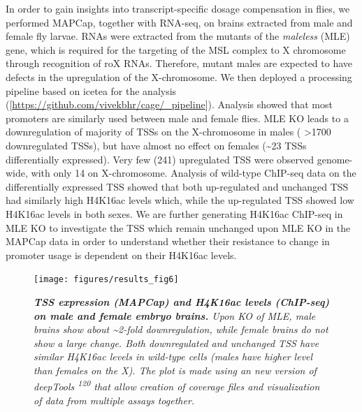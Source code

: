 \documentclass[11pt,twoside]{MPIthesis}
\theoremstyle{definition}
\theoremstyle{definition}
\theoremstyle{definition}
\theoremstyle{remark}
\begin{document}
In order to gain insights into transcript-specific dosage compensation
in flies, we performed MAPCap, together with RNA-seq, on brains
extracted from male and female fly larvae. RNAs were extracted from the
mutants of the \emph{maleless} (MLE) gene, which is required for the
targeting of the MSL complex to X chromosome through recognition of roX
RNAs. Therefore, mutant males are expected to have defects in the
upregulation of the X-chromosome. We then deployed a processing pipeline
based on icetea for the analysis
({[}{\url{https://github.com/vivekbhr/cage/_pipeline}}{]}). Analysis
showed that most promoters are similarly used between male and female
flies. MLE KO leads to a downregulation of majority of TSSs on the
X-chromosome in males ( \textgreater{}1700 downregulated TSSs), but have
almost no effect on females (\textasciitilde{}23 TSSs differentially
expressed). Very few (241) upregulated TSS were observed genome-wide,
with only 14 on X-chromosome. Analysis of wild-type ChIP-seq data on the
differentially expressed TSS showed that both up-regulated and unchanged
TSS had similarly high H4K16ac levels which, while the up-regulated TSS
showed low H4K16ac levels in both sexes. We are further generating
H4K16ac ChIP-seq in MLE KO to investigate the TSS which remain unchanged
upon MLE KO in the MAPCap data in order to understand whether their
resistance to change in promoter usage is dependent on their H4K16ac
levels.

\clearpage
\begin{figure}

{\centering \texttt{[image: figures/results\_fig6]} 

}

\caption[TSS expression (MAPCap) and H4K16ac levels (ChIP-seq) on male and female embryo brains]{\emph{\textbf{TSS expression (MAPCap) and H4K16ac levels
(ChIP-seq) on male and female embryo brains.} Upon KO of MLE, male
brains show about \textasciitilde{}2-fold downregulation, while female
brains do not show a large change. Both downregulated and unchanged TSS
have similar H4K16ac levels in wild-type cells (males have higher level
than females on the X). The plot is made using an new version of
deepTools \textsuperscript{120} that allow creation of coverage files
and visualization of data from multiple assays together.}}\label{fig:unnamed-chunk-11}
\end{figure}
\end{document}
